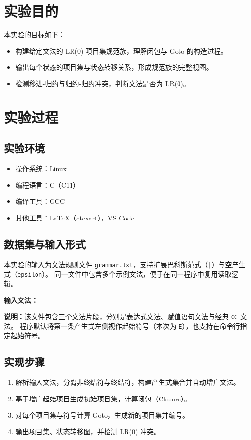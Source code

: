 \documentclass[12pt,a4paper]{ctexart}
\title{\reporttitle}
\author{\authname：\underline{李祥熙} \quad \authid：\underline{2234412799}}
\date{\today}
\begin{document}
\maketitle

\section{实验目的}
本实验的目标如下：
\begin{itemize}
	\item 构建给定文法的 LR(0) 项目集规范族，理解闭包与 Goto 的构造过程。
	\item 输出每个状态的项目集与状态转移关系，形成规范族的完整视图。
	\item 检测移进-归约与归约-归约冲突，判断文法是否为 LR(0)。
\end{itemize}

\section{实验过程}
\subsection{实验环境}
\begin{itemize}
	\item 操作系统：Linux
	\item 编程语言：C（C11）
	\item 编译工具：GCC
	\item 其他工具：LaTeX（ctexart），VS Code
\end{itemize}

\subsection{数据集与输入形式}
本实验的输入为文法规则文件 \texttt{grammar.txt}，支持扩展巴科斯范式（\texttt{|}）与空产生式（\texttt{epsilon}）。
同一文件中包含多个示例文法，便于在同一程序中复用读取逻辑。

\textbf{输入文法：}



\textbf{说明：}该文件包含三个文法片段，分别是表达式文法、赋值语句文法与经典 \texttt{CC} 文法。
程序默认将第一条产生式左侧视作起始符号（本次为 \texttt{E}），也支持在命令行指定起始符号。

\subsection{实现步骤}
\begin{enumerate}
	\item 解析输入文法，分离非终结符与终结符，构建产生式集合并自动增广文法。
	\item 基于增广起始项目生成初始项目集，计算闭包（Closure）。
	\item 对每个项目集与符号计算 Goto，生成新的项目集并编号。
	\item 输出项目集、状态转移图，并检测 LR(0) 冲突。
\end{enumerate}
\end{document}
